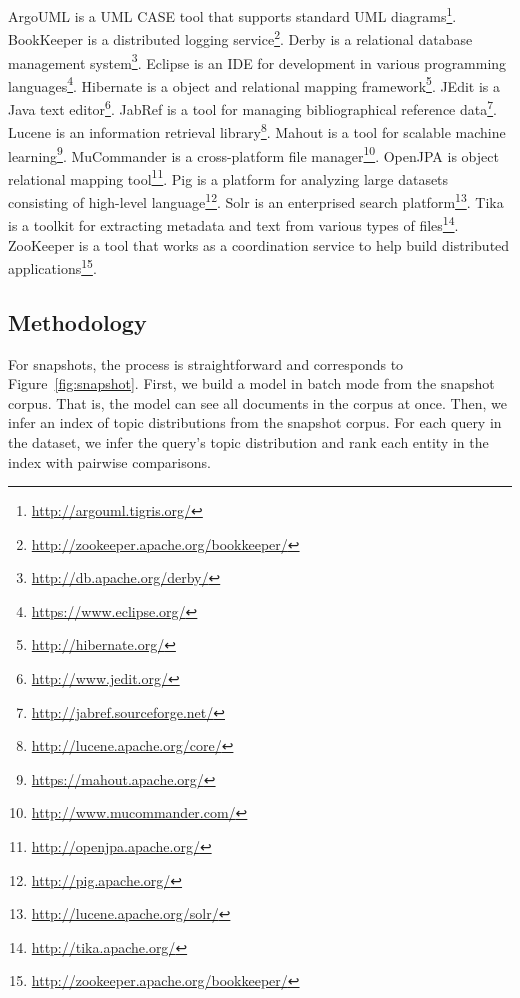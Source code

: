 ArgoUML is a UML CASE tool that supports standard UML diagrams\footnote{\url{http://argouml.tigris.org/}}.
BookKeeper is a distributed logging service\footnote{\url{http://zookeeper.apache.org/bookkeeper/}}.
Derby is a relational database management system\footnote{\url{http://db.apache.org/derby/}}.
Eclipse is an IDE for development in various programming languages\footnote{\url{https://www.eclipse.org/}}.
Hibernate is a object and relational mapping framework\footnote{\url{http://hibernate.org/}}.
JEdit is a Java text editor\footnote{\url{http://www.jedit.org/}}.
JabRef is a tool for managing bibliographical reference data\footnote{\url{http://jabref.sourceforge.net/}}.
Lucene is an information retrieval library\footnote{\url{http://lucene.apache.org/core/}}.
Mahout is a tool for scalable machine learning\footnote{\url{https://mahout.apache.org/}}.
MuCommander is a cross-platform file manager\footnote{\url{http://www.mucommander.com/}}.
OpenJPA is object relational mapping tool\footnote{\url{http://openjpa.apache.org/}}.
Pig is a platform for analyzing large datasets consisting of high-level language\footnote{\url{http://pig.apache.org/}}.
Solr is an enterprised search platform\footnote{\url{http://lucene.apache.org/solr/}}.
Tika is a toolkit for extracting metadata and text from various types of files\footnote{\url{http://tika.apache.org/}}.
ZooKeeper is a tool that works as a coordination service to help build distributed applications\footnote{\url{http://zookeeper.apache.org/bookkeeper/}}.



\subsection{Methodology}
\label{sec:methodology}

For snapshots, the process is straightforward and corresponds to
Figure~\ref{fig:snapshot}.  First, we build a model in batch mode from the
snapshot corpus.  That is, the model can see all documents in the corpus at
once.  Then, we infer an index of topic distributions from the snapshot corpus.
For each query in the dataset, we infer the query's topic distribution and rank
each entity in the index with pairwise comparisons.

